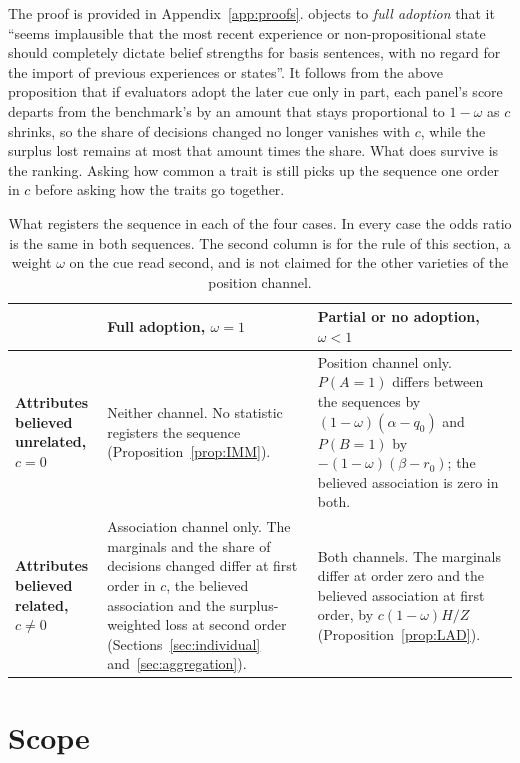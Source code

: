 \documentclass[a4paper,fleqn]{cas-sc}
\theoremstyle{remark}
\theoremstyle{definition}
\begin{document}
The proof is provided in Appendix~\ref{app:proofs}. \citet{Hawthorne2004} objects to \emph{full adoption} that it ``seems implausible that the
most recent experience or non-propositional state should completely dictate belief
strengths for basis sentences, with no regard for the import of previous experiences
or states''. It follows from the above proposition that if evaluators adopt the later cue only in
part, each panel's score departs from the benchmark's by an amount that stays
proportional to $1-\omega$ as $c$ shrinks, so the share of decisions changed no longer
vanishes with $c$, while the surplus lost remains at most that amount times the share.
What does survive is the ranking. Asking how common a trait is still picks up the
sequence one order in $c$ before asking how the traits go together. 

\begin{table}[htbp]
\centering
\small
\begin{tabular}{@{}p{3.0cm}p{5.6cm}p{5.6cm}@{}}
\toprule
 & \textbf{Full adoption, $\omega=1$} & \textbf{Partial or no adoption, $\omega<1$} \\
\midrule
\textbf{Attributes believed unrelated, $c=0$}
  & Neither channel. No statistic registers the sequence (Proposition~\ref{prop:IMM}).
  & Position channel only. $P(A{=}1)$ differs between the sequences by $(1-\omega)(\alpha-q_0)$ and $P(B{=}1)$ by $-(1-\omega)(\beta-r_0)$; the believed association is zero in both. \\
\addlinespace
\textbf{Attributes believed related, $c\neq0$}
  & Association channel only. The marginals and the share of decisions changed differ at first order in $c$, the believed association and the surplus-weighted loss at second order (Sections~\ref{sec:individual} and~\ref{sec:aggregation}).
  & Both channels. The marginals differ at order zero and the believed association at first order, by $c(1-\omega)H/Z$ (Proposition~\ref{prop:LAD}). \\
\bottomrule
\end{tabular}
\caption{What registers the sequence in each of the four cases. In every case the odds
ratio is the same in both sequences. The second column is for the rule of this section,
a weight $\omega$ on the cue read second, and is not claimed for the other varieties of
the position channel.}
\label{tab:cases}
\end{table}

\section{Scope}
\label{sec:scope}
\end{document}
